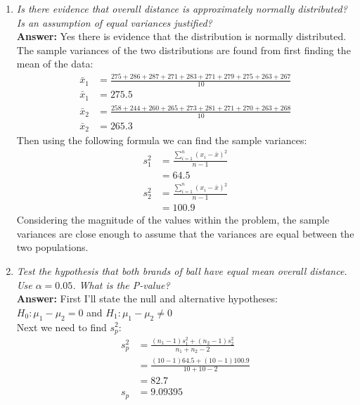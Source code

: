 \documentclass[11pt]{article}
\begin{document}
\begin{enumerate}
\item \emph{Is there evidence that overall distance is approximately normally distributed? Is an assumption of equal variances justified?}
\\\textbf{Answer:} Yes there is evidence that the distribution is normally distributed. The sample variances of the two distributions are found from first finding the mean of the data: 
\begin{equation}
\begin{split}
\bar{x}_1 &= \frac{275 + 286 + 287 + 271 + 283 + 271 + 279 + 275 + 263 + 267}{10} \\
\bar{x}_1 &= 275.5 \\
\bar{x}_2 &= \frac{258 + 244+260+265+273+281+271+270+263+268}{10} \\
\bar{x}_2 &= 265.3 
\end{split}
\end{equation}
Then using the following formula we can find the sample variances:
\begin{equation}
\begin{split}
s_1^2 &= \frac{\sum_{i=1}^{n}(x_i-\bar{x})^2}{n-1}\\
&=64.5\\
s_2^2 &= \frac{\sum_{i=1}^{n}(x_i-\bar{x})^2}{n-1}\\
&=100.9
\end{split}
\end{equation}
Considering the magnitude of the values within the problem, the sample variances are close enough to assume that the variances are equal between the two populations.\\
\item \emph{Test the hypothesis that both brands of ball have equal mean overall distance. Use $\alpha = 0.05$. What is the P-value?}
\\\textbf{Answer:} First I'll state the null and alternative hypotheses:\\
$H_0: \mu_1 - \mu_2 = 0$ and $H_1: \mu_1 - \mu_2 \neq 0$ \\
Next we need to find $s_p^2$:
\begin{equation}
\begin{split}
s_p^2 &= \frac{(n_1-1)s_1^2 + (n_2 - 1)s_2^2}{n_1 + n_2 -2} \\
&= \frac{(10 - 1)64.5 + (10 -1)100.9}{10+10-2}\\
&=82.7\\
s_p &= 9.09395
\end{split}

\end{equation}
\end{enumerate}
\end{document}
